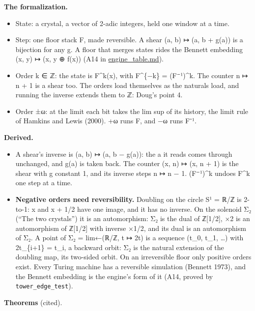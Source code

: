\textbf{The formalization.}

\begin{itemize}
\item State: a crystal, a vector of 2-adic integers, held one window at a time.
\item Step: one floor stack F, made reversible. A shear (a, b) ↦ (a, b + g(a)) is a bijection for any g. A floor that merges states rides the Bennett embedding (x, y) ↦ (x, y ⊕ f(x)) (A14 in \hyperref[chap:engine-table]{engine\_\allowbreak{}table.md}).
\item Order k ∈ ℤ: the state is F\textasciicircum{}k(x), with F\textasciicircum{}\{−k\} = (F⁻¹)\textasciicircum{}k. The counter n ↦ n + 1 is a shear too. The orders load themselves as the naturals load, and running the inverse extends them to ℤ: Doug's point 4.
\item Order ±ω: at the limit each bit takes the lim sup of its history, the limit rule of Hamkins and Lewis (2000). +ω runs F, and −ω runs F⁻¹.
\end{itemize}

\textbf{Derived.}

\begin{itemize}
\item A shear's inverse is (a, b) ↦ (a, b − g(a)): the a it reads comes through unchanged, and g(a) is taken back. The counter (x, n) ↦ (x, n + 1) is the shear with g constant 1, and its inverse steps n ↦ n − 1. (F⁻¹)\textasciicircum{}k undoes F\textasciicircum{}k one step at a time.
\item \textbf{Negative orders need reversibility.} Doubling on the circle S¹ = ℝ/ℤ is 2-to-1: x and x + 1/2 have one image, and it has no inverse. On the solenoid Σ₂ (“The two crystals”) it is an automorphism: Σ₂ is the dual of ℤ[1/2], ×2 is an automorphism of ℤ[1/2] with inverse ×1/2, and its dual is an automorphism of Σ₂. A point of Σ₂ = lim←(ℝ/ℤ, t ↦ 2t) is a sequence (t\_\allowbreak{}0, t\_\allowbreak{}1, …) with 2t\_\allowbreak{}\{i+1\} = t\_\allowbreak{}i, a backward orbit: Σ₂ is the natural extension of the doubling map, its two-sided orbit. On an irreversible floor only positive orders exist. Every Turing machine has a reversible simulation (Bennett 1973), and the Bennett embedding is the engine's form of it (A14, proved by \texttt{tower\_\allowbreak{}edge\_\allowbreak{}test}).
\end{itemize}

\textbf{Theorems} (cited).

